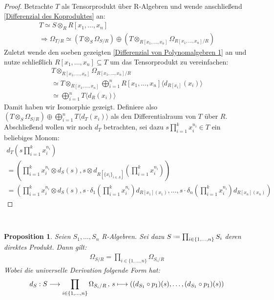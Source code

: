 \documentclass[10pt,a4paper]{report}
\newcounter{Aussage}[chapter]
\newtheorem{prop}[Aussage]{Proposition}
\newcommand{\function}[5]{\nolinebreak{#1:#2 \longrightarrow #3 \, , \, #4 \longmapsto #5}}
\newcommand{\divR}[2]{\Omega_{#1/#2}}
\newcommand{\divf}[1]{d_{#1}}
\newcommand{\Tensor}[3]{#1 \otimes_{#2} #3}
\newcommand{\tensor}[3]{#1 \otimes #3}
\newcommand*{\defeq}{\mathrel{\vcenter{\baselineskip0.5ex \lineskiplimit0pt
                     \hbox{\scriptsize.}\hbox{\scriptsize.}}}%
                     =}
\newcommand{\Verz}[1]{\langle #1 \rangle}
\begin{document}
\begin{proof}
Betrachte $T$ als Tensorprodukt über R-Algebren und wende anschließend \cref{Differenzial des Koproduktes} an:
\begin{gather*}
T \simeq \Tensor{S}{R}{R[x_1,...,x_n]} \\
\Rightarrow \divR{T}{R} \simeq (\Tensor{T}{S}{\divR{S}{R}}) \oplus (\Tensor{T}{R[x_1,...,x_n]}{\divR{R[x_1,...,x_n]}{R}})
\end{gather*}
Zuletzt wende den soeben gezeigten \cref{Differenzial von Polynomalgebren 1} an und nutze schließlich $R[x_1,...,x_n] \subseteq T$ um das Tensorprodukt zu vereinfachen:
\begin{gather*}
\Tensor{T}{R[x_1,...,x_n]}{\divR{R[x_1,...,x_n]}{R}}\\
\simeq \Tensor{T}{R[x_1,...,x_n]}{\bigoplus_{i = 1}^n R[x_1,...,x_n]\langle \divf{R[x_i]}(x_i) \rangle } \\
\simeq \bigoplus_{i = 1}^n T \langle \divf{R}(x_i) \rangle
\end{gather*}
Damit haben wir Isomorphie gezeigt. Definiere also $(\Tensor{T}{S}{\divR{S}{R}}) \oplus \bigoplus_{i = 1}^n T \Verz{\divf{T}(x_i)}$ als den Differentialraum von $T$ über $R$.\\
Abschließend wollen wir noch $\divf{T}$ betrachten, sei dazu $s\prod_{i =1}^k x_i^{n_i} \in T$ ein beliebiges Monom:
\begin{gather*}
d_T\left(s\prod_{i =1}^k x_i^{n_i}\right) \\
= \left(\tensor{\prod_{i =1}^k x_i^{n_i}}{S}{\divf{S}(s)},
 \tensor{s}{R[\lbrace x_i \rbrace_{i \in \Lambda}]}{\divf{R[\lbrace x_i \rbrace_{i \in \Lambda}]}}\left(\prod_{i =1}^k x_i^{n_i}\right)\right)\\
=\left(\tensor{\prod_{i =1}^k x_i^{n_i}}{S}{\divf{S}(s)},
s \cdot \delta_1 \left( \prod_{i =1}^k x_i^{n_i} \right) \divf{R[x_1](x_1)} , \dots , s \cdot \delta_n \left( \prod_{i =1}^k x_i^{n_i} \right) \divf{R[x_n](x_n)} \right)
\end{gather*}
\end{proof}


\ \\
\begin{prop}\label{Differenzial des Produktes von Algebren}
Seien $S_1, \dots , S_n$ R-Algebren. Sei dazu $S \defeq \prod_{i \in \lbrace 1, \dots , n \rbrace} S_i$ deren direktes Produkt.
Dann gilt:
\begin{gather*}
\divR{S}{R} = \prod_{i \in \lbrace 1, \dots , n \rbrace} \divR{S_i}{R}
\end{gather*}
Wobei die universelle Derivation folgende Form hat:
\begin{gather*}
\function{\divf{S}}{S}{\prod_{i \in \lbrace 1, \dots , n \rbrace} \divR{S_i}{R}}{s}{((\divf{S_1} \circ p_1)(s) , \dots , (\divf{S_1} \circ p_1)(s) )}
\end{gather*}
\end{prop}
\end{document}
